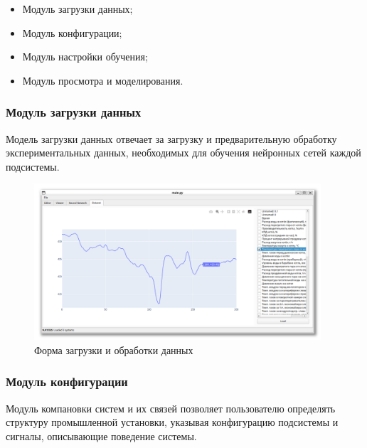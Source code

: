 \begin{itemize}
  \item Модуль загрузки данных;
  \item Модуль конфигурации;
  \item Модуль настройки обучения;
  \item Модуль просмотра и моделирования.
\end{itemize}

\subsubsection{Модуль загрузки данных}

Модель загрузки данных отвечает за загрузку и предварительную обработку
экспериментальных данных, необходимых для обучения нейронных сетей каждой
подсистемы. 

\begin{figure}[H]
  \begin{center}
    \includegraphics[width=0.95\textwidth]{figures/modules/loader.png}
  \end{center}
  \caption{Форма загрузки и обработки данных}\label{fig:forms:loader}
\end{figure}

\subsubsection{Модуль конфигурации}

Модуль компановки систем и их связей позволяет пользователю определять структуру
промышленной установки, указывая конфигурацию подсистемы и сигналы, описывающие
поведение системы. 

